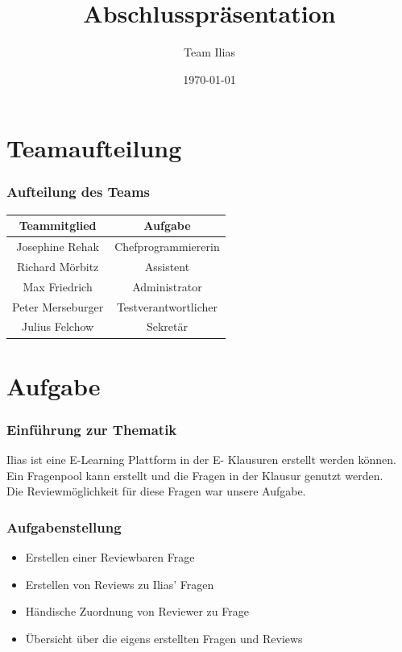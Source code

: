 \documentclass{beamer}
\title{Abschlusspräsentation}
\author{Team Ilias}
\date{\today}
\begin{document}
	\maketitle
	\frame{\tableofcontents[]}

	\section{Teamaufteilung}
	\begin{frame}
		\frametitle{Aufteilung des Teams}
		\begin{tabular}{|c|c|}\hline
			Teammitglied & Aufgabe \\\hline
			Josephine Rehak & Chefprogrammiererin\\\hline
			Richard Mörbitz & Assistent\\\hline
			Max Friedrich & Administrator\\\hline
			Peter Merseburger & Testverantwortlicher\\\hline
			Julius Felchow & Sekretär\\\hline
		\end{tabular}
	\end{frame} 
 
	\section{Aufgabe}
		\begin{frame}
			\frametitle{Einführung zur Thematik}
  			Ilias ist eine E-Learning Plattform in der E-					Klausuren erstellt werden können. Ein Fragenpool 				kann erstellt und die Fragen in der Klausur 					genutzt werden.\\
  			\pause
    		Die Reviewmöglichkeit für diese Fragen war unsere 				Aufgabe.
		\end{frame}
		\begin{frame}
			\frametitle{Aufgabenstellung}
			\begin{itemize}
				\item Erstellen einer Reviewbaren Frage
				\item Erstellen von Reviews zu Ilias' Fragen
				\item Händische Zuordnung von Reviewer zu Frage
				\item Übersicht über die eigens erstellten Fragen und Reviews
				
			\end{itemize}
		\end{frame}
\end{document}
